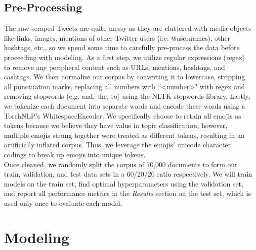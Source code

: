 \documentclass[11pt]{article}
\begin{document}
\subsection{Pre-Processing}

The raw scraped Tweets are quite messy as they are cluttered with media objects like links, images, mentions of other Twitter users (i.e. @usernames), other hashtags, etc., so we spend some time to carefully pre-process the data before proceeding with modeling. As a first step, we utilize regular expressions (regex) to remove any peripheral content such as URLs, mentions, hashtags, and cashtags. We then normalize our corpus by converting it to lowercase, stripping all punctuation marks, replacing all numbers with ``\textless number\textgreater" with regex and removing stopwords (e.g. and, the, to) using the NLTK stopwords library. Lastly, we tokenize each document into separate words and encode these words using a TorchNLP's WhitespaceEncoder. We specifically choose to retain all emojis as tokens because we believe they have value in topic classification, however, multiple emojis strung together were treated as different tokens, resulting in an artificially inflated corpus. Thus, we leverage the emojis' unicode character codings to break up emojis into unique tokens.
\\[5pt]
\noindent Once cleaned, we randomly split the corpus of 70,000 documents to form our train, validation, and test data sets in a 60/20/20 ratio respectively. We will train models on the train set, find optimal hyperparameters using the validation set, and report all performance metrics in the \emph{Results} section on the test set, which is used only once to evaluate each model.


\section{Modeling}
\end{document}
